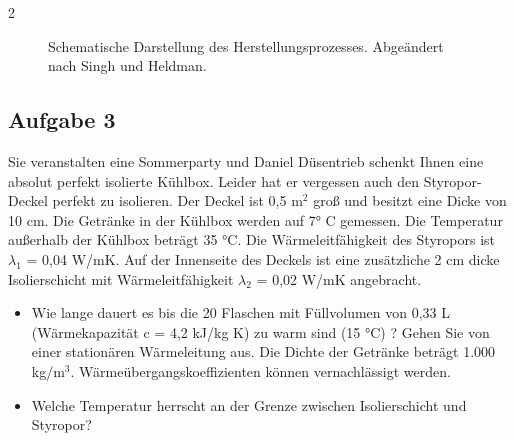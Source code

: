 \documentclass[a4paper,10pt]{article}
\begin{document}
\begin{multicols}{2}
\begin{figure}[H]
\caption{Schematische Darstellung des Herstellungsprozesses. Abgeändert nach Singh und Heldman.}
\label{masse}
\end{figure}

\subsection*{Aufgabe 3}
Sie veranstalten eine Sommerparty und Daniel Düsentrieb schenkt Ihnen eine absolut perfekt isolierte Kühlbox. Leider hat er vergessen auch den Styropor-Deckel perfekt zu isolieren.
Der Deckel ist 0,5 m$^2$ groß und besitzt eine Dicke von 10 cm. 
Die Getränke in der Kühlbox werden auf 7° C gemessen. Die Temperatur außerhalb der Kühlbox beträgt 35 °C. Die Wärmeleitfähigkeit des Styropors ist $\lambda_1$ = 0,04 W/mK. Auf der Innenseite des Deckels ist eine zusätzliche 2 cm dicke Isolierschicht mit Wärmeleitfähigkeit $\lambda_2$ = 0,02 W/mK angebracht. 

\begin{itemize}
\item Wie lange dauert es bis die 20 Flaschen mit Füllvolumen von 0,33 L (Wärmekapazität c = 4,2 kJ/kg K) zu warm sind (15 °C) ? Gehen Sie von einer stationären Wärmeleitung aus. Die Dichte der Getränke beträgt 1.000 kg/m$^3$. Wärmeübergangskoeffizienten können vernachlässigt werden.
\item Welche Temperatur herrscht an der Grenze zwischen Isolierschicht und Styropor?
\end{itemize}


\end{multicols}
\end{document}
